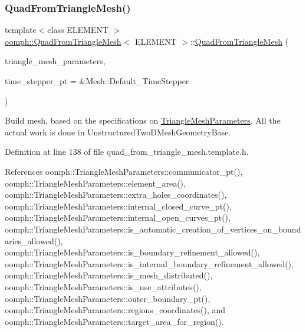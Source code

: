 \subsubsection{\texorpdfstring{Quad\+From\+Triangle\+Mesh()}{QuadFromTriangleMesh()}\hspace{0.1cm}{\footnotesize\ttfamily [3/4]}}
{\footnotesize\ttfamily template$<$class E\+L\+E\+M\+E\+NT $>$ \\
\hyperlink{classoomph_1_1QuadFromTriangleMesh}{oomph\+::\+Quad\+From\+Triangle\+Mesh}$<$ E\+L\+E\+M\+E\+NT $>$\+::\hyperlink{classoomph_1_1QuadFromTriangleMesh}{Quad\+From\+Triangle\+Mesh} (\begin{DoxyParamCaption}\item[{\hyperlink{classoomph_1_1TriangleMeshParameters}{Triangle\+Mesh\+Parameters} \&}]{triangle\+\_\+mesh\+\_\+parameters,  }\item[{Time\+Stepper $\ast$}]{time\+\_\+stepper\+\_\+pt = {\ttfamily \&Mesh\+:\+:Default\+\_\+TimeStepper} }\end{DoxyParamCaption})\hspace{0.3cm}{\ttfamily [inline]}}



Build mesh, based on the specifications on \hyperlink{classoomph_1_1TriangleMeshParameters}{Triangle\+Mesh\+Parameters}. All the actual work is done in Unstructured\+Two\+D\+Mesh\+Geometry\+Base. 



Definition at line 138 of file quad\+\_\+from\+\_\+triangle\+\_\+mesh.\+template.\+h.



References oomph\+::\+Triangle\+Mesh\+Parameters\+::communicator\+\_\+pt(), oomph\+::\+Triangle\+Mesh\+Parameters\+::element\+\_\+area(), oomph\+::\+Triangle\+Mesh\+Parameters\+::extra\+\_\+holes\+\_\+coordinates(), oomph\+::\+Triangle\+Mesh\+Parameters\+::internal\+\_\+closed\+\_\+curve\+\_\+pt(), oomph\+::\+Triangle\+Mesh\+Parameters\+::internal\+\_\+open\+\_\+curves\+\_\+pt(), oomph\+::\+Triangle\+Mesh\+Parameters\+::is\+\_\+automatic\+\_\+creation\+\_\+of\+\_\+vertices\+\_\+on\+\_\+boundaries\+\_\+allowed(), oomph\+::\+Triangle\+Mesh\+Parameters\+::is\+\_\+boundary\+\_\+refinement\+\_\+allowed(), oomph\+::\+Triangle\+Mesh\+Parameters\+::is\+\_\+internal\+\_\+boundary\+\_\+refinement\+\_\+allowed(), oomph\+::\+Triangle\+Mesh\+Parameters\+::is\+\_\+mesh\+\_\+distributed(), oomph\+::\+Triangle\+Mesh\+Parameters\+::is\+\_\+use\+\_\+attributes(), oomph\+::\+Triangle\+Mesh\+Parameters\+::outer\+\_\+boundary\+\_\+pt(), oomph\+::\+Triangle\+Mesh\+Parameters\+::regions\+\_\+coordinates(), and oomph\+::\+Triangle\+Mesh\+Parameters\+::target\+\_\+area\+\_\+for\+\_\+region().

